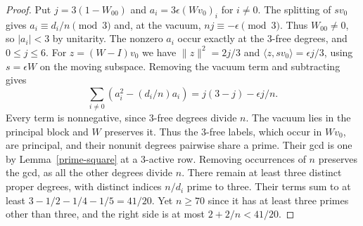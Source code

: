 \documentclass[11pt]{amsart}
\numberwithin{equation}{section}
\begin{document}
\begin{proof}
Put $j=3(1-W_{00})$ and $a_i=3\epsilon(Wv_0)_i$ for $i\ne0$. The
splitting of $sv_0$ gives $a_i\equiv d_i/n\pmod3$ and, at the vacuum,
$nj\equiv-\epsilon\pmod3$. Thus $W_{00}\ne0$, so $|a_i|<3$ by
unitarity. The nonzero $a_i$ occur exactly at the $3$-free degrees,
and $0\le j\le6$. For $z=(W-I)v_0$ we have $\|z\|^2=2j/3$ and
$\langle z,sv_0\rangle=\epsilon j/3$, using $s=\epsilon W$ on the
moving subspace. Removing the vacuum term and subtracting gives
\[
 \sum_{i\ne0}(a_i^2-(d_i/n)a_i)=j(3-j)-\epsilon j/n.
\]
Every term is nonnegative, since $3$-free degrees divide $n$. The
vacuum lies in the principal block and $W$ preserves it. Thus the
$3$-free labels, which occur in $Wv_0$, are principal, and their
nonunit degrees pairwise share a prime. Their gcd is one by
Lemma~\ref{prime-square} at a $3$-active row. Removing occurrences
of $n$ preserves the gcd, as all the other degrees divide $n$.
There remain at least three distinct proper degrees, with distinct
indices $n/d_i$ prime to three. Their terms sum to at least
$3-1/2-1/4-1/5=41/20$. Yet $n\ge70$ since it has at least three
primes other than three, and the right side is at most $2+2/n<41/20$.
\end{proof}
\end{document}
